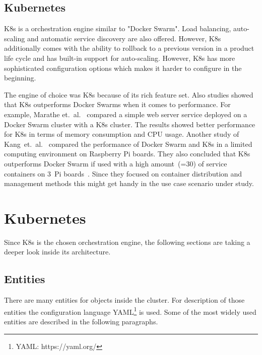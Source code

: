  
\subsection{Kubernetes}
\acf{K8s} is a orchestration engine similar to "Docker Swarm". Load balancing, auto-scaling and automatic service discovery are also offered. However, \ac{K8s} additionally comes with the ability to rollback to a previous version in a product life cycle and has built-in support for auto-scaling.
However, \ac{K8s} has more sophisticated configuration options which makes it harder to configure in the beginning.


The engine of choice was \ac{K8s} because of its rich feature set.
Also studies showed that \ac{K8s} outperforms Docker Swarms when it comes to performance. For example, Marathe et.~al.~\cite{Marathe.2019} compared a simple web server service deployed on a Docker Swarm cluster with a \ac{K8s} cluster. The results showed better performance for \ac{K8s} in terms of memory consumption and CPU usage. Another study of Kang~et.~al.~\cite{Kang.2021} compared the performance of Docker Swarm and \ac{K8s} in a limited computing environment on Raspberry Pi boards. They also concluded that \ac{K8s} outperforms Docker Swarm if used with a high amount~(=30) of service containers on 3~Pi boards~\cite{Kang.2021}. Since they focused on container distribution and management methods this might get handy in the use case scenario under study.


\section{Kubernetes}
Since \ac{K8s} is the chosen orchestration engine, the following sections are taking a deeper look inside its architecture.

\subsection{Entities}
There are many entities for objects inside the cluster. For description of those entities the configuration language YAML\footnote{YAML: https://yaml.org/} is used. Some of the most widely used entities are described in the following paragraphs.

